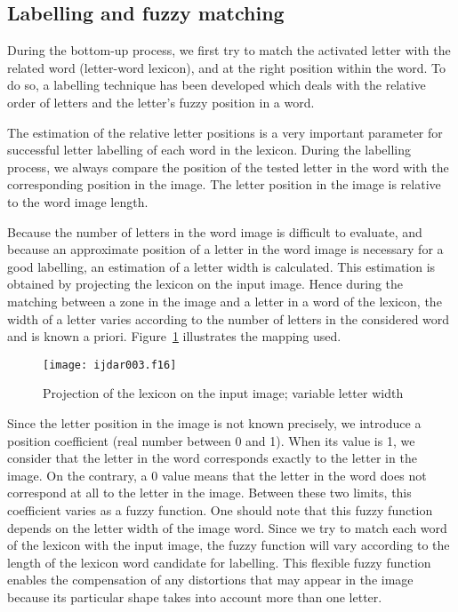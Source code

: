 \documentclass[ijdar]{svjour}
\begin{document}
\subsection{Labelling and fuzzy matching}
\label{sec-label}

During the bottom-up process, we first try to match the activated letter with the related word (letter-word lexicon), and at the right position within the word.
To do so, a labelling technique has been developed which deals with the relative order of letters and the letter's fuzzy position in a word.

The estimation of the relative letter positions is a very important parameter for successful letter labelling of each word in the lexicon.
During the labelling process, we always compare the position of the tested letter in the word with the corresponding position in the image.
The letter position in the image is relative to the word image length.


Because the number of letters in the word image is difficult to evaluate, and because an approximate position of a letter in the word image is necessary for a good labelling, an estimation of a letter width is calculated.
This estimation is obtained by projecting the lexicon on the input image.
Hence during the matching between a zone in the image and a letter in a word of the lexicon, the width of a letter varies according to the number of letters in the considered word and is known a priori.
Figure~\ref{FIGMAPPING} illustrates the mapping used.

\begin{figure}%
\texttt{[image: ijdar003.f16]}%
\caption{Projection of the lexicon on the input image; variable letter width}
\label{FIGMAPPING}
\end{figure}

Since the letter position in the image is not known precisely, we introduce a position coefficient (real number between 0 and 1).
When its value is 1, we consider that the letter in the word corresponds exactly to the letter in the image.
On the contrary, a 0 value means that the letter in the word does not correspond at all to the letter in the image.
Between these two limits, this coefficient varies as a fuzzy function.
One should note that this fuzzy function depends on the letter width of the image word.
Since we try to match each word of the lexicon with the input image, the fuzzy function will vary according to the length of the lexicon word candidate for labelling.
This flexible fuzzy function enables the compensation of any
distortions
that may appear in the image because its particular shape takes into account more than one letter.
\end{document}
